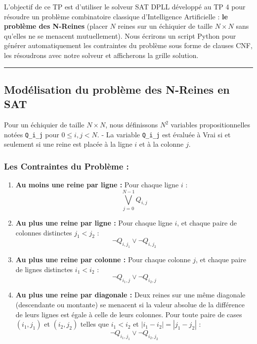 \documentclass[11pt,a4paper]{article}
\begin{document}
L'objectif de ce TP est d'utiliser le solveur SAT DPLL développé au TP 4
pour résoudre un problème combinatoire classique d'Intelligence
Artificielle : \textbf{le problème des N-Reines} (placer \(N\) reines
sur un échiquier de taille \(N \times N\) sans qu'elles ne se menacent
mutuellement). Nous écrirons un script Python pour générer
automatiquement les contraintes du problème sous forme de clauses CNF,
les résoudrons avec notre solveur et afficherons la grille solution.

\begin{center}\rule{0.5\linewidth}{0.5pt}\end{center}

\hypertarget{moduxe9lisation-du-probluxe8me-des-n-reines-en-sat}{%
\subsection{Modélisation du problème des N-Reines en
SAT}\label{moduxe9lisation-du-probluxe8me-des-n-reines-en-sat}}

Pour un échiquier de taille \(N \times N\), nous définissons \(N^2\)
variables propositionnelles notées \texttt{Q\_i\_j} pour
\(0 \le i, j < N\). - La variable \texttt{Q\_i\_j} est évaluée à Vrai si
et seulement si une reine est placée à la ligne \(i\) et à la colonne
\(j\).

\hypertarget{les-contraintes-du-probluxe8me}{%
\subsubsection{Les Contraintes du Problème
:}\label{les-contraintes-du-probluxe8me}}

\begin{enumerate}
\def\labelenumi{\arabic{enumi}.}
\tightlist
\item
  \textbf{Au moins une reine par ligne :} Pour chaque ligne \(i\) :
  \[\bigvee_{j=0}^{N-1} Q_{i, j}\]
\item
  \textbf{Au plus une reine par ligne :} Pour chaque ligne \(i\), et
  chaque paire de colonnes distinctes \(j_1 < j_2\) :
  \[\neg Q_{i, j_1} \lor \neg Q_{i, j_2}\]
\item
  \textbf{Au plus une reine par colonne :} Pour chaque colonne \(j\), et
  chaque paire de lignes distinctes \(i_1 < i_2\) :
  \[\neg Q_{i_1, j} \lor \neg Q_{i_2, j}\]
\item
  \textbf{Au plus une reine par diagonale :} Deux reines sur une même
  diagonale (descendante ou montante) se menacent si la valeur absolue
  de la différence de leurs lignes est égale à celle de leurs colonnes.
  Pour toute paire de cases \((i_1, j_1)\) et \((i_2, j_2)\) telles que
  \(i_1 < i_2\) et \(|i_1 - i_2| = |j_1 - j_2|\) :
  \[\neg Q_{i_1, j_1} \lor \neg Q_{i_2, j_2}\]
\end{enumerate}
\end{document}
